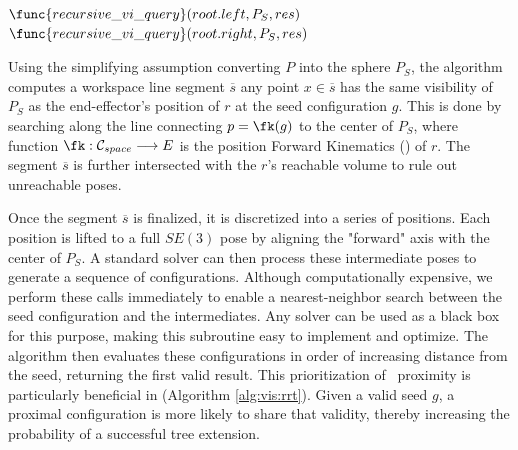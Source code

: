 \vspace{-0.3cm}

\begin{algorithm}
    \caption{Recursive VI-tree query}%
    \label{alg:vi:tree:query}
    \SetAlgoLined%
     {
        \Return
    }
     {
        $\func{recursive\_vi\_query}(root.left, P_S, res)$
    }
     {
        $\func{recursive\_vi\_query}(root.right, P_S, res)$
    }
    \Return
\end{algorithm}


Using the simplifying assumption converting $P$ into the sphere $P_S$, the algorithm computes a workspace line segment $\overline{s}$ any point $x\in \overline{s}$ has the same visibility of $P_S$ as the end-effector's position of $r$ at the seed configuration $g$. This is done by searching along the line connecting $p=\fk(g)$ to the center of $P_S$, where function $\fk:\mathcal{C}_{space} \longrightarrow E$ is the position Forward Kinematics (\fk) of $r$. The segment $\overline{s}$ is further intersected with the $r$'s reachable volume to rule out unreachable poses.

Once the segment $\overline{s}$ is finalized, it is discretized into a series of positions. Each position is lifted to a full $SE(3)$ pose by aligning the "forward" axis with the center of $P_S$. A standard \ik solver can then process these intermediate poses to generate a sequence of configurations. Although computationally expensive, we perform these \ik calls immediately to enable a \cspace{} nearest-neighbor search between the seed configuration and the intermediates. Any \ik solver can be used as a black box for this purpose, making this subroutine easy to implement and optimize. The algorithm then evaluates these configurations in order of increasing distance from the seed, returning the first valid result. This prioritization of \cspace ~proximity is particularly beneficial in \visrrt (Algorithm \ref{alg:vis:rrt}). Given a valid seed $g$, a proximal configuration is more likely to share that validity, thereby increasing the probability of a successful tree extension.

